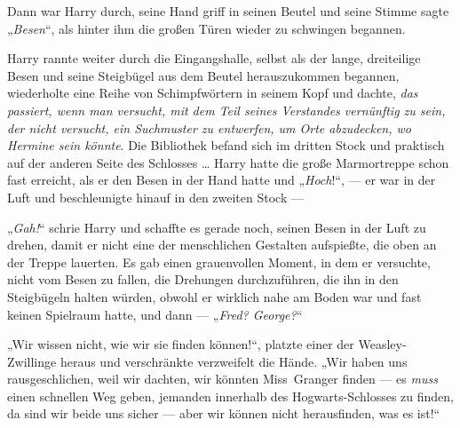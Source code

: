Dann war Harry durch, seine Hand griff in seinen Beutel und seine Stimme sagte
„\emph{Besen}“, als hinter ihm die großen Türen wieder zu schwingen begannen.

Harry rannte weiter durch die Eingangshalle, selbst als der lange, dreiteilige Besen und seine Steigbügel aus dem Beutel herauszukommen begannen, wiederholte eine Reihe von Schimpfwörtern in seinem Kopf und dachte, \emph{das passiert, wenn man versucht, mit dem Teil seines Verstandes vernünftig zu sein, der nicht versucht, ein Suchmuster zu entwerfen, um Orte abzudecken, wo Hermine sein könnte}. Die Bibliothek befand sich im dritten Stock und praktisch auf der anderen Seite des Schlosses … Harry hatte die große Marmortreppe schon fast erreicht, als er den Besen in der Hand hatte und
„\emph{Hoch}!“, — er war in der Luft und beschleunigte hinauf in den zweiten Stock —

„\emph{Gah!}“ schrie Harry und schaffte es gerade noch, seinen Besen in der Luft zu drehen, damit er nicht eine der menschlichen Gestalten aufspießte, die oben an der Treppe lauerten. Es gab einen grauenvollen Moment, in dem er versuchte, nicht vom Besen zu fallen, die Drehungen durchzuführen, die ihn in den Steigbügeln halten würden, obwohl er wirklich nahe am Boden war und fast keinen Spielraum hatte, und dann —
„\emph{Fred? George?}“

„Wir wissen nicht, wie wir sie finden können!“, platzte einer der Weasley-Zwillinge heraus und verschränkte verzweifelt die Hände.
„Wir haben uns rausgeschlichen, weil wir dachten, wir könnten Miss~Granger finden — es \emph{muss} einen schnellen Weg geben, jemanden innerhalb des Hogwarts-Schlosses zu finden, da sind wir beide uns sicher — aber wir können nicht herausfinden, was es ist!“

